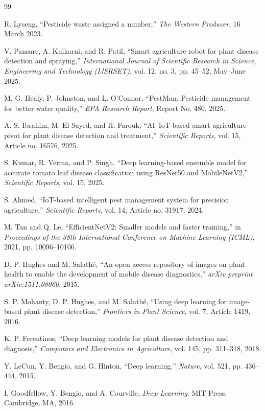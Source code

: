 \documentclass[12pt,a4paper,oneside]{report}
\begin{document}
\newpage
\begin{thebibliography}{99}

R. Lyseng, ``Pesticide waste assigned a number,'' \textit{The Western Producer}, 16 March 2023.

V. Pansare, A. Kulkarni, and R. Patil, ``Smart agriculture robot for plant disease detection and spraying,'' \textit{International Journal of Scientific Research in Science, Engineering and Technology (IJSRSET)}, vol. 12, no. 3, pp. 45--52, May--June 2025.

M. G. Healy, P. Johnston, and L. O'Connor, ``PestMan: Pesticide management for better water quality,'' \textit{EPA Research Report}, Report No. 480, 2025.

A. S. Ibrahim, M. El-Sayed, and H. Farouk, ``AI--IoT based smart agriculture pivot for plant disease detection and treatment,'' \textit{Scientific Reports}, vol. 15, Article no. 16576, 2025.

S. Kumar, R. Verma, and P. Singh, ``Deep learning-based ensemble model for accurate tomato leaf disease classification using ResNet50 and MobileNetV2,'' \textit{Scientific Reports}, vol. 15, 2025.

S. Ahmed, ``IoT-based intelligent pest management system for precision agriculture,'' \textit{Scientific Reports}, vol. 14, Article no. 31917, 2024.

M. Tan and Q. Le, ``EfficientNetV2: Smaller models and faster training,'' in \textit{Proceedings of the 38th International Conference on Machine Learning (ICML)}, 2021, pp. 10096--10106.

D. P. Hughes and M. Salathé, ``An open access repository of images on plant health to enable the development of mobile disease diagnostics,'' \textit{arXiv preprint arXiv:1511.08060}, 2015.

S. P. Mohanty, D. P. Hughes, and M. Salathé, ``Using deep learning for image-based plant disease detection,'' \textit{Frontiers in Plant Science}, vol. 7, Article 1419, 2016.

K. P. Ferentinos, ``Deep learning models for plant disease detection and diagnosis,'' \textit{Computers and Electronics in Agriculture}, vol. 145, pp. 311--318, 2018.

Y. LeCun, Y. Bengio, and G. Hinton, ``Deep learning,'' \textit{Nature}, vol. 521, pp. 436--444, 2015.

I. Goodfellow, Y. Bengio, and A. Courville, \textit{Deep Learning}. MIT Press, Cambridge, MA, 2016.

\end{thebibliography}
\end{document}
